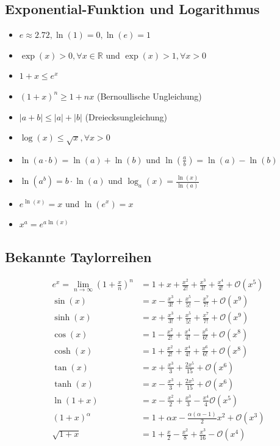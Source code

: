 \documentclass[a4paper,8pt]{extarticle}
\begin{document}
\subsection{Exponential-Funktion und Logarithmus}
\begin{itemize}
  \item $e \approx 2.72, \ln (1)=0, \ln (e)=1$
  \item  $\exp (x)>0, \forall x \in \mathbb{R}$ und $\exp (x)>1, \forall x>0$
  \item $1+x \leq e^{x}$
  \item $(1+x)^{n} \geq 1+n x$ (Bernoullische Ungleichung)
  \item $|a+b| \leq|a|+|b|$ (Dreiecksungleichung)
  \item $\log (x) \leq \sqrt{x}, \forall x>0$
  \item $\ln (a \cdot b)=\ln (a)+\ln (b)$ und $\ln \left(\frac{a}{b}\right)=\ln (a)-\ln (b)$
  \item $\ln \left(a^{b}\right)=b \cdot \ln (a)$ und $\log _{a}(x)=\frac{\ln (x)}{\ln (a)}$
  \item $e^{\ln (x)}=x$ und $\ln \left(e^{x}\right)=x$
  \item $x^{a}=e^{a \ln (x)}$
\end{itemize}

\subsection{Bekannte Taylorreihen}
\begin{align*}
  e^x = \lim_{n \to \infty} \left(1 + \frac{x}{n} \right)^n & = 1 + x + \frac{x^2}{2!} + \frac{x^3}{3!} + \frac{x^4}{4!} + \mathcal{O}(x^5) \\
  \sin(x) & = x - \frac{x^3}{3!} + \frac{x^5}{5!} - \frac{x^7}{7!} + \mathcal{O}(x^9) \\ 
  \sinh(x) & = x + \frac{x^3}{3!} + \frac{x^5}{5!} + \frac{x^7}{7!} + \mathcal{O}(x^9) \\ 
  \cos(x) & = 1 - \frac{x^2}{2!} + \frac{x^4}{4!} - \frac{x^6}{6!} + \mathcal{O}(x^8) \\  
  \cosh(x) & = 1 + \frac{x^2}{2!} + \frac{x^4}{4!} + \frac{x^6}{6!} + \mathcal{O}(x^8) \\  
  \tan(x) & = x + \frac{x^3}{3} + \frac{2x^5}{15} + \mathcal{O}(x^6) \\ 
  \tanh(x) & = x - \frac{x^3}{3} + \frac{2x^5}{15} + \mathcal{O}(x^6) \\ 
  \ln(1 + x) & = x - \frac{x^2}{2} + \frac{x^3}{3} - \frac{x^4}{4} \mathcal{O}(x^5) \\
  (1 + x)^\alpha & = 1 + \alpha x - \frac{\alpha (\alpha - 1)}{2}x^2 + \mathcal{O}(x^3) \\ 
  \sqrt{1 + x} & = 1 + \frac{x}{2} - \frac{x^2}{8} + \frac{x^3}{16} - \mathcal{O}(x^4) \\
\end{align*}
\end{document}
